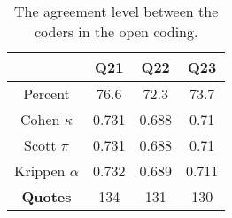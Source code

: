 \begin{table}[t]
\caption{The agreement level between the coders in the open
coding.}
\label{table: agreement level}
\centering
\begin{tabular}{cccc}
\hline
                & \textbf{Q21} & \textbf{Q22} & \textbf{Q23} \\ \hline
Percent         & 76.6         & 72.3         & 73.7         \\ \hline
Cohen   $\kappa$        & 0.731        & 0.688        & 0.71         \\ \hline
Scott  $\pi$         & 0.731        & 0.688        & 0.71         \\ \hline
Krippen  $\alpha$       & 0.732        & 0.689        & 0.711        \\ \hline
\textbf{Quotes} & 134          & 131          & 130          \\ \hline
\end{tabular}
\end{table}
